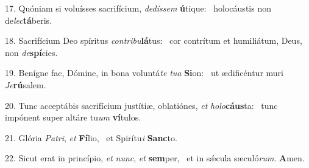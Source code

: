 17. Quóniam si voluísses sacrifícium, \textit{de}\textit{dís}\textit{sem} \textbf{ú}tique: \ast\  holocáustis non de\textit{lec}\textbf{tá}beris.\

18. Sacrifícium Deo spíritus \textit{con}\textit{tri}\textit{bu}\textbf{lá}tus: \ast\  cor contrítum et humiliátum, Deus, non \textit{de}\textbf{spí}cies.\

19. Benígne fac, Dómine, in bona voluntá\textit{te} \textit{tu}\textit{a} \textbf{Si}on: \ast\  ut ædificéntur muri \textit{Je}\textbf{rú}salem.\

20. Tunc acceptábis sacrifícium justítiæ, oblatiónes, \textit{et} \textit{ho}\textit{lo}\textbf{cáus}ta: \ast\  tunc impónent super altáre tu\textit{um} \textbf{ví}tulos.\

21. Glória \textit{Pa}\textit{tri}, \textit{et} \textbf{Fí}lio, \ast\  et Spirítu\textit{i} \textbf{Sanc}to.\

22. Sicut erat in princípio, \textit{et} \textit{nunc}, \textit{et} \textbf{sem}per, \ast\  et in sǽcula sæculó\textit{rum}. \textbf{A}men.\

